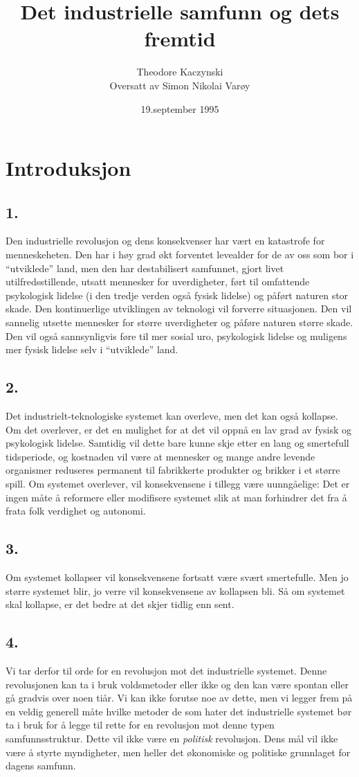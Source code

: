 \documentclass[oneside]{book}
\title{Det industrielle samfunn og dets fremtid}
\author{Theodore Kaczynski\\Oversatt av Simon Nikolai Varøy}
\date{19.september 1995}
\begin{document}
\maketitle
\doclicenseThis
\tableofcontents

\chapter{Introduksjon}
\section*{1.}
Den industrielle revolusjon og dens konsekvenser har vært en katastrofe for
menneskeheten. Den har i høy grad økt forventet levealder for de av oss som bor
i ``utviklede'' land, men den har destabilisert samfunnet, gjort livet
utilfredsstillende, utsatt mennesker for uverdigheter, ført til omfattende
psykologisk lidelse (i den tredje verden også fysisk lidelse) og påført naturen
stor skade. Den kontinuerlige utviklingen av teknologi vil forverre
situasjonen. Den vil sannelig utsette mennesker for større uverdigheter og
påføre naturen større skade. Den vil også sannsynligvis føre til mer sosial
uro, psykologisk lidelse og muligens mer fysisk lidelse selv i ``utviklede''
land.

\section*{2.}
Det industrielt-teknologiske systemet kan overleve, men det kan også kollapse.
Om det overlever, er det en mulighet for at det vil oppnå en lav grad av fysisk
og psykologisk lidelse. Samtidig vil dette bare kunne skje etter en lang og
smertefull tidsperiode, og kostnaden vil være at mennesker og mange andre
levende organismer reduseres permanent til fabrikkerte produkter og brikker i
et større spill. Om systemet overlever, vil konsekvensene i tillegg være
uunngåelige: Det er ingen måte å reformere eller modifisere systemet slik at
man forhindrer det fra å frata folk verdighet og autonomi.

\section*{3.}
Om systemet kollapser vil konsekvensene fortsatt være svært smertefulle. Men jo
større systemet blir, jo verre vil konsekvensene av kollapsen bli. Så om
systemet skal kollapse, er det bedre at det skjer tidlig enn sent.

\section*{4.}
Vi tar derfor til orde for en revolusjon mot det industrielle systemet. Denne
revolusjonen kan ta i bruk voldsmetoder eller ikke og den kan være spontan
eller gå gradvis over noen tiår. Vi kan ikke forutse noe av dette, men vi
legger frem på en veldig generell måte hvilke metoder de som hater det
industrielle systemet bør ta i bruk for å legge til rette for en revolusjon mot
denne typen samfunnsstruktur. Dette vil ikke være en \emph{politisk} revolusjon.
Dens mål vil ikke være å styrte myndigheter, men heller det økonomiske og
politiske grunnlaget for dagens samfunn.
\end{document}
